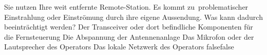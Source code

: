     {Sie nutzen Ihre weit entfernte Remote-Station. Es kommt zu problematischer Einstrahlung oder Einströmung durch ihre eigene Aussendung. Was kann dadurch beeinträchtigt werden?}
    {Der Transceiver oder dort befindliche Komponenten für die Fernsteuerung}
    {Die Abspannung der Antennenanlage}
    {Das Mikrofon oder der Lautsprecher des Operators}
    {Das lokale Netzwerk des Operators}
    {false}{false}